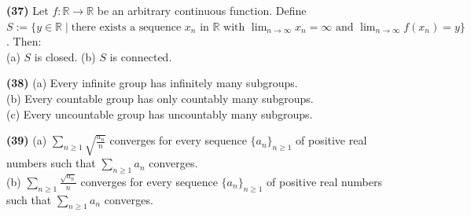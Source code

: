 \documentclass[11pt,a4paper]{article}
\newcommand{\R}{\mathbb{R}}
\newcommand{\qitem}[1]{\par\medskip\noindent\textbf{#1}\hspace{0.5em}}
\begin{document}
\qitem{(37)} Let $f : \R \to \R$ be an arbitrary continuous function. Define $S := \{y \in \R \mid \text{there exists a sequence } x_n \text{ in } \R \text{ with } \lim_{n \to \infty} x_n = \infty \text{ and } \lim_{n \to \infty} f(x_n) = y\}$. Then:\\
(a) $S$ is closed. \qquad (b) $S$ is connected.

\qitem{(38)} (a) Every infinite group has infinitely many subgroups.\\
(b) Every countable group has only countably many subgroups.\\
(c) Every uncountable group has uncountably many subgroups.

\qitem{(39)} (a) $\sum_{n \ge 1} \sqrt{\frac{a_n}{n}}$ converges for every sequence $\{a_n\}_{n \ge 1}$ of positive real numbers such that $\sum_{n \ge 1} a_n$ converges.\\
(b) $\sum_{n \ge 1} \frac{\sqrt{a_n}}{n}$ converges for every sequence $\{a_n\}_{n \ge 1}$ of positive real numbers such that $\sum_{n \ge 1} a_n$ converges.
\end{document}

